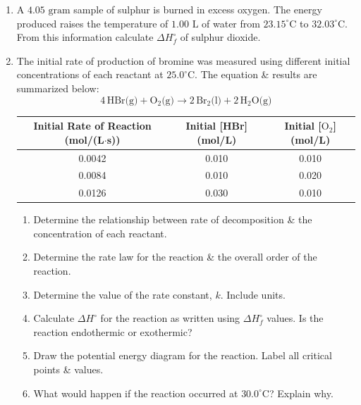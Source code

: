 \documentclass[12pt]{article}
\begin{document}
\begin{enumerate}[label=\arabic*.]
    \item A $4.05\text{ gram}$ sample of sulphur is burned in excess oxygen. The energy produced raises the temperature of $1.00\text{ L}$ of water from $23.15^\circ\text{C}$ to $32.03^\circ\text{C}$. From this information calculate $\Delta H^\circ_f$ of sulphur dioxide.
    \vspace{4.5cm}

    \item The initial rate of production of bromine was measured using different initial concentrations of each reactant at $25.0^\circ\text{C}$. The equation \& results are summarized below:
    \[
    4\,\text{HBr(g)} + \text{O}_2\text{(g)} \rightarrow 2\,\text{Br}_2\text{(l)} + 2\,\text{H}_2\text{O(g)}
    \]
    \begin{center}
    \begin{tabular}{|c|c|c|}
    \hline
    \textbf{Initial Rate of Reaction (mol/(L$\cdot$s))} & \textbf{Initial [HBr] (mol/L)} & \textbf{Initial [$\text{O}_2$] (mol/L)} \\ \hline
    0.0042 & 0.010 & 0.010 \\ \hline
    0.0084 & 0.010 & 0.020 \\ \hline
    0.0126 & 0.030 & 0.010 \\ \hline
    \end{tabular}
    \end{center}
    \begin{enumerate}[label=\alph*)]
        \item Determine the relationship between rate of decomposition \& the concentration of each reactant.
        \vspace{2cm}
        \item Determine the rate law for the reaction \& the overall order of the reaction.
        \vspace{2cm}
        \item Determine the value of the rate constant, $k$. Include units.
        \vspace{2cm}
        \item Calculate $\Delta H^\circ$ for the reaction as written using $\Delta H^\circ_f$ values. Is the reaction endothermic or exothermic?
        \vspace{2.5cm}
        \item Draw the potential energy diagram for the reaction. Label all critical points \& values.
        \vspace{4.5cm}
        \item What would happen if the reaction occurred at $30.0^\circ\text{C}$? Explain why.
        \vspace{2.5cm}
    \end{enumerate}
\end{enumerate}
\end{document}
